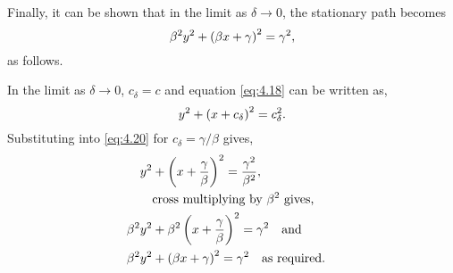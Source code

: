 Finally, it can be shown that in the limit as $\delta \rightarrow 0$, the stationary path becomes
\[
	\beta^2 y^2 + \left(\beta x + \gamma\right)^2 = \gamma^2,
\]
as follows.

In the limit as $\delta \rightarrow 0$, $c_\delta = c$ and equation \eqref{eq:4.18} can be written as,
\begin{equation}
	\label{eq:4.20}
	y^2 + \left(x + c_\delta\right)^2 = c_\delta^2.
\end{equation}
Substituting into \eqref{eq:4.20} for $c_\delta = \gamma / \beta$ gives,
\begin{align*}
	y^2 &+ \left(x + \frac{\gamma}{\beta}\right)^2 = \frac{\gamma^2}{\beta^2},\\
	&\text{cross multiplying by $\beta^2$ gives,}\\
	\beta^2y^2 &+ \beta^2\left(x + \frac{\gamma}{\beta}\right)^2 = \gamma^2 \quad\text{and}\quad\\
	\beta^2y^2 &+ \left(\beta x + \gamma\right)^2 = \gamma^2 \quad\text{as required.}\quad
\end{align*}
	
